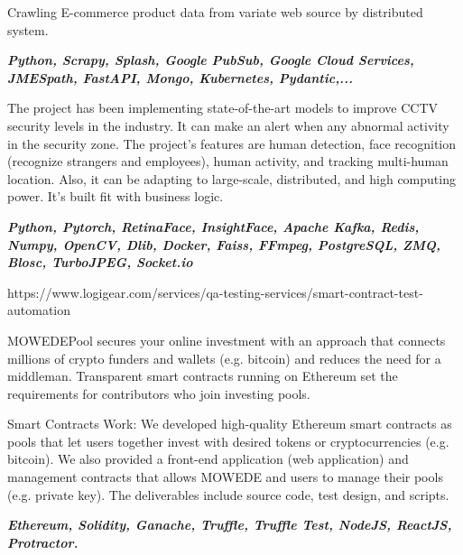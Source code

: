 \documentclass[10pt,a4paper,ragged2e,withhyper]{altacv}
\begin{document}
\medskip

\divider

\begin{minipage}{\linewidth}
	\justifying
	Crawling E-commerce product data from variate web source by distributed system.
	
	\textit{\textbf{Python, Scrapy, Splash, Google PubSub, Google Cloud Services, JMESpath, FastAPI, Mongo, Kubernetes, Pydantic,...}}
	
\end{minipage}

\medskip

\divider

\medskip

\begin{minipage}{\linewidth}
	\justifying
	
	The project has been implementing state-of-the-art models to improve CCTV security levels in the industry. It can make an alert when any abnormal activity in the security zone. The project's features are human detection, face recognition (recognize strangers and employees), human activity, and tracking multi-human location. Also, it can be adapting to large-scale, distributed, and high computing power.
	\smallskip
	It's built fit with business logic.
	
	\textit{\textbf{Python, Pytorch, RetinaFace, InsightFace, Apache Kafka, Redis, Numpy, OpenCV, Dlib, Docker, Faiss, FFmpeg, PostgreSQL, ZMQ, Blosc, TurboJPEG, Socket.io}}
\end{minipage}

\medskip

\divider

\medskip

 {https://www.logigear.com/services/qa-testing-services/smart-contract-test-automation}
\begin{minipage}{\linewidth}
	\justifying
	
	MOWEDEPool secures your online investment with an approach that connects millions of crypto funders and wallets (e.g. bitcoin) and reduces the need for a middleman. Transparent smart contracts running on Ethereum set the requirements for contributors who join investing pools.
	
	Smart Contracts Work: We developed high-quality Ethereum smart contracts as pools that let users together invest with desired tokens or cryptocurrencies (e.g. bitcoin). We also provided a front-end application (web application) and management contracts that allows MOWEDE and users to manage their pools (e.g. private key). The deliverables include source code, test design, and scripts.
	\smallskip
	
	\textit{\textbf{Ethereum, Solidity, Ganache, Truffle, Truffle Test, NodeJS, ReactJS, Protractor.}}
\end{minipage}
\end{document}
